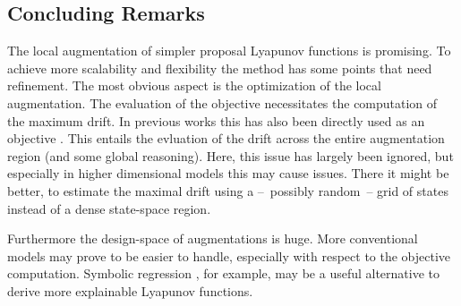 \subsection{Concluding Remarks}
The local augmentation of simpler proposal Lyapunov functions is promising.
To achieve more scalability and flexibility the method has some points that need refinement.
The most obvious aspect is the optimization of the local augmentation.
The evaluation of the objective necessitates the computation of the maximum drift.
In previous works this has also been directly used as an objective \parencite{milias2014optimization}.
This entails the evluation of the drift across the entire augmentation region (and some global reasoning).
Here, this issue has largely been ignored, but especially in higher dimensional models this may cause issues.
There it might be better, to estimate the maximal drift using a --~possibly random~-- grid of states instead of a dense state-space region.

Furthermore the design-space of augmentations is huge.
More conventional models may prove to be easier to handle, especially with respect to the objective computation.
Symbolic regression \parencite{pysr}, for example, may be a useful alternative to derive more explainable Lyapunov functions.


